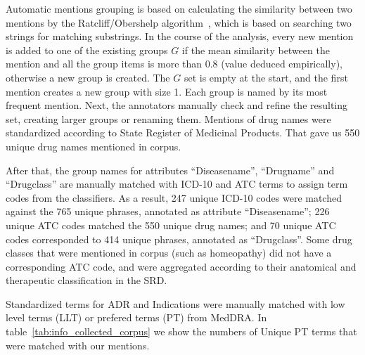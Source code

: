 \documentclass[a4paper,fleqn,longmktitle]{cas-dc}
\begin{document}
Automatic mentions grouping is based on calculating the similarity between two mentions by the Ratcliff/Obershelp algorithm~\cite{ratcliff1988pattern}, which is based on searching two strings for matching substrings. In the course of the analysis, every new mention is added to one of the existing groups $G$ if the mean similarity between the mention and all the group items is more than 0.8 (value deduced empirically), otherwise a new group is created. The $G$ set is empty at the start, and the first mention creates a new group with size 1. Each group is named by its most frequent mention. Next, the annotators manually check and refine the resulting set, creating larger groups or renaming them. Mentions of drug names were standardized according to State Register of Medicinal Products. That gave us 550 unique drug names mentioned in corpus.

After that, the group names for attributes ``Diseasename'', ``Drugname'' and ``Drugclass'' are manually matched with ICD-10 and ATC terms to assign term codes from the classifiers. As a result, 247 unique ICD-10 codes were matched against the 765 unique phrases, annotated as attribute ``Diseasename''; 226 unique ATC codes matched the 550 unique drug names; and 70 unique ATC codes corresponded to 414 unique phrases, annotated as ``Drugclass''. Some drug classes that were mentioned in corpus (such as homeopathy) did not have a corresponding ATC code, and were aggregated according to their anatomical and therapeutic classification in the SRD.

Standardized terms for ADR and Indications were manually matched with low level terms (LLT) or prefered terms (PT) from MedDRA. In table~\ref{tab:info_collected_corpus} we show the numbers of Unique PT terms that were matched with our mentions.
\end{document}
